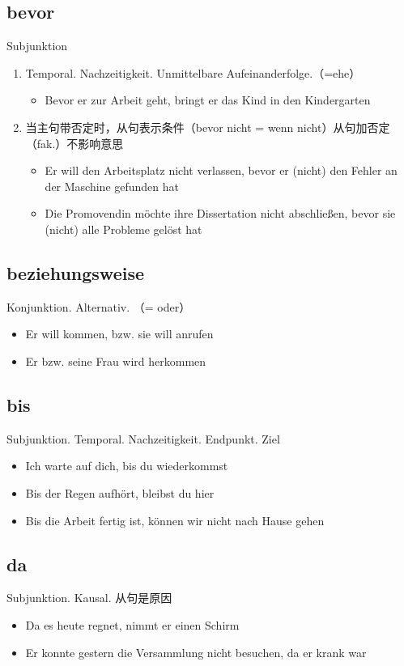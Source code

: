 \documentclass[UTF8]{report}
\begin{document}
\subsection{bevor}
Subjunktion
\begin{enumerate}
    \item Temporal. Nachzeitigkeit. Unmittelbare Aufeinanderfolge.（=ehe）
    \begin{itemize}
        \item Bevor er zur Arbeit geht, bringt er das Kind in den Kindergarten
    \end{itemize}
    \item 当主句带否定时，从句表示条件（bevor nicht = wenn nicht）从句加否定（fak.）不影响意思
    \begin{itemize}
        \item Er will den Arbeitsplatz nicht verlassen, bevor er (nicht) den Fehler an der Maschine gefunden hat
        \item Die Promovendin möchte ihre Dissertation nicht abschließen, bevor sie (nicht) alle Probleme gelöst hat
    \end{itemize}
\end{enumerate}


\subsection{beziehungsweise}
Konjunktion. Alternativ. （= oder）
\begin{itemize}
    \item Er will kommen, bzw. sie will anrufen
    \item Er bzw. seine Frau wird herkommen
\end{itemize}


\subsection{bis}
Subjunktion. Temporal. Nachzeitigkeit. Endpunkt. Ziel
\begin{itemize}
    \item Ich warte auf dich, bis du wiederkommst
    \item Bis der Regen aufhört, bleibst du hier
    \item Bis die Arbeit fertig ist, können wir nicht nach Hause gehen
\end{itemize}

\subsection{da}
Subjunktion. Kausal. 从句是原因
\begin{itemize}
    \item Da es heute regnet, nimmt er einen Schirm
    \item Er konnte gestern die Versammlung nicht besuchen, da er krank war
\end{itemize}
\end{document}
